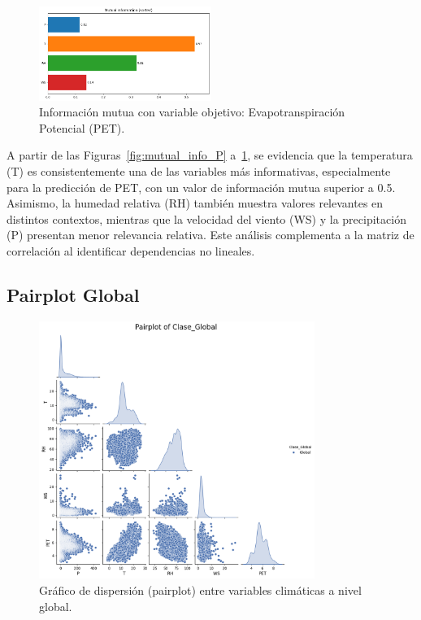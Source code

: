 \begin{figure}[H]
    \centering
    \includegraphics[width=0.5\textwidth]{resultados/global/bivariado/mutual_info_PET.png}
    \caption{Información mutua con variable objetivo: Evapotranspiración Potencial (PET).}
    \label{fig:mutual_info_PET}
\end{figure}

A partir de las Figuras~\ref{fig:mutual_info_P} a~\ref{fig:mutual_info_PET}, se evidencia que la temperatura (T) es consistentemente una de las variables más informativas, especialmente para la predicción de PET, con un valor de información mutua superior a 0.5. Asimismo, la humedad relativa (RH) también muestra valores relevantes en distintos contextos, mientras que la velocidad del viento (WS) y la precipitación (P) presentan menor relevancia relativa. Este análisis complementa a la matriz de correlación al identificar dependencias no lineales.

\subsection{Pairplot Global}

\begin{figure}[H]
    \centering
    \includegraphics[width=0.8\textwidth]{resultados/global/bivariado/pairplot_global.png}
    \caption{Gráfico de dispersión (pairplot) entre variables climáticas a nivel global.}
    \label{fig:pairplot_global}
\end{figure}

